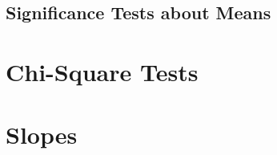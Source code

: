 \documentclass[../AP_Statistics.tex]{subfiles}
\begin{document}
		\section{Significance Tests about Means}
	\chapter{Chi-Square Tests}
	\chapter{Slopes}
\end{document}
